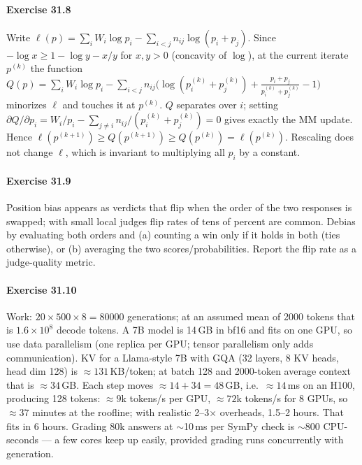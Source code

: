 \paragraph{Exercise 31.8} Write $\ell(p) = \sum_i W_i \log p_i - \sum_{i<j} n_{ij}\log(p_i+p_j)$.
Since $-\log x \ge 1 - \log y - x/y$ for $x, y > 0$ (concavity of $\log$), at the current iterate
$p^{(k)}$ the function
$Q(p) = \sum_i W_i\log p_i - \sum_{i<j} n_{ij}\bigl(\log(p^{(k)}_i+p^{(k)}_j) + \frac{p_i+p_j}{p^{(k)}_i+p^{(k)}_j} - 1\bigr)$
minorizes $\ell$ and touches it at $p^{(k)}$. $Q$ separates over $i$; setting
$\partial Q/\partial p_i = W_i/p_i - \sum_{j\ne i} n_{ij}/(p^{(k)}_i+p^{(k)}_j) = 0$ gives exactly the
MM update. Hence $\ell(p^{(k+1)}) \ge Q(p^{(k+1)}) \ge Q(p^{(k)}) = \ell(p^{(k)})$. Rescaling
does not change $\ell$, which is invariant to multiplying all $p_i$ by a constant.

\paragraph{Exercise 31.9} Position bias appears as verdicts that flip when the order of the two
responses is swapped; with small local judges flip rates of tens of percent are common. Debias by
evaluating both orders and (a) counting a win only if it holds in both (ties otherwise), or (b)
averaging the two scores/probabilities. Report the flip rate as a judge-quality metric.

\paragraph{Exercise 31.10} Work: $20 \times 500 \times 8 = \num{80000}$ generations; at an assumed
mean of 2000 tokens that is $1.6\times10^8$ decode tokens. A 7B model is 14\,GB in bf16 and fits on
one GPU, so use data parallelism (one replica per GPU; tensor parallelism only adds communication).
KV for a Llama-style 7B with GQA (32 layers, 8 KV heads, head dim 128) is $\approx 131$\,KB/token; at
batch 128 and 2000-token average context that is $\approx 34$\,GB. Each step moves
$\approx 14 + 34 = 48$\,GB, i.e.\ $\approx 14$\,ms on an H100, producing 128 tokens: $\approx 9$k
tokens/s per GPU, $\approx 72$k tokens/s for 8 GPUs, so $\approx 37$ minutes at the roofline; with
realistic 2--3$\times$ overheads, 1.5--2 hours. That fits in 6 hours. Grading 80k answers at
$\sim$10\,ms per SymPy check is $\sim$800 CPU-seconds --- a few cores keep up easily, provided
grading runs concurrently with generation.
